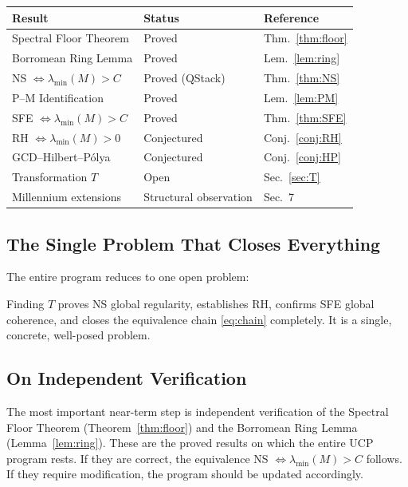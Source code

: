 \documentclass[12pt]{article}
\begin{document}
\begin{center}
\renewcommand{\arraystretch}{1.4}
\begin{tabular}{lll}
\toprule
Result & Status & Reference \\
\midrule
Spectral Floor Theorem & Proved & Thm.~\ref{thm:floor} \\
Borromean Ring Lemma & Proved & Lem.~\ref{lem:ring} \\
NS $\Leftrightarrow \lambda_{\min}(M)>C$ & Proved (QStack) & Thm.~\ref{thm:NS} \\
P--M Identification & Proved & Lem.~\ref{lem:PM} \\
SFE $\Leftrightarrow \lambda_{\min}(M)>C$ & Proved & Thm.~\ref{thm:SFE} \\
RH $\Leftrightarrow \lambda_{\min}(M)>0$ & Conjectured & Conj.~\ref{conj:RH} \\
GCD--Hilbert--P\'{o}lya & Conjectured & Conj.~\ref{conj:HP} \\
Transformation $T$ & Open & Sec.~\ref{sec:T} \\
Millennium extensions & Structural observation & Sec.~7 \\
\bottomrule
\end{tabular}
\end{center}

\subsection{The Single Problem That Closes Everything}

The entire program reduces to one open problem:

\begin{center}
\end{center}

Finding $T$ proves NS global regularity, establishes RH,
confirms SFE global coherence, and closes the equivalence
chain \eqref{eq:chain} completely.
It is a single, concrete, well-posed problem.

\subsection{On Independent Verification}

The most important near-term step is independent verification
of the Spectral Floor Theorem (Theorem~\ref{thm:floor}) and
the Borromean Ring Lemma (Lemma~\ref{lem:ring}).
These are the proved results on which the entire UCP program
rests. If they are correct, the equivalence
NS $\Leftrightarrow \lambda_{\min}(M) > C$ follows.
If they require modification, the program should be updated
accordingly.
\end{document}
